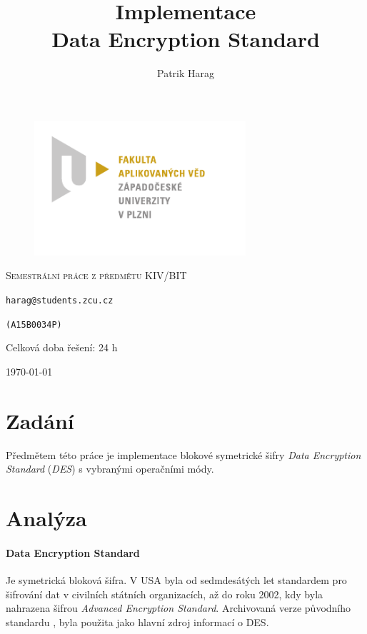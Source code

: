 \documentclass[12pt, a4paper]{article}
\title{Implementace\\Data Encryption Standard}
\author{Patrik Harag}
\makeatletter
\def \thesubtitle {Semestrální práce z předmětu KIV/BIT}
\def \theauthoremail {harag@students.zcu.cz}
\def \theauthorid {(A15B0034P)}
\makeatother
\begin{document}
\begin{titlepage}
	\begin{figure}
		\includegraphics[height=50mm]{img-fav-logo}
	\end{figure}
	
	\centering
	{\large \hspace{1mm} \par} %
	\vspace{15ex}
	
	{\scshape\Large \thesubtitle \par}
	\vspace{1.5ex}
	{\huge\bfseries \thetitle \par}
	\vspace{2ex}
	{\Large\itshape \theauthor \par}
	\vspace{2ex}
	{\texttt{\theauthoremail} \par}
	\vspace{1ex}
	{\texttt{\theauthorid} \par}
	\vspace{5ex}
	{{Celková doba řešení: 24 h} \par}
	
	\vfill

	{\today\par}
\end{titlepage}

\section{Zadání}
Předmětem této práce je implementace blokové symetrické šifry \emph{Data Encryption Standard} (\emph{DES}) s vybranými operačními módy.

\section{Analýza}
\paragraph{Data Encryption Standard}
Je symetrická bloková šifra.
V USA byla od sedmdesátých let standardem pro šifrování dat v civilních státních organizacích, až do roku 2002, kdy byla nahrazena šifrou \emph{Advanced Encryption Standard}.
Archivovaná verze původního standardu \cite{fips46}, byla použita jako hlavní zdroj informací o DES.
\end{document}
